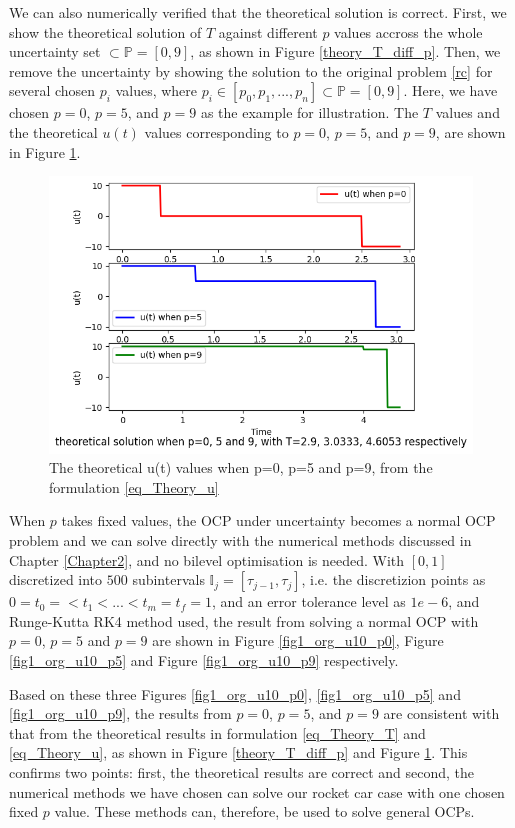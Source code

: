\documentclass  [
  paper    = a4,
  BCOR     = 10mm,
  twoside,
  fontsize = 12pt,
  fleqn,
  toc      = bibnumbered,
  toc      = listofnumbered,
  numbers  = noendperiod,
  headings = normal,
  listof   = leveldown,
  version  = 3.03
]                                       {scrreprt}
\newcommand{\<}{\langle}
\renewcommand{\>}{\rangle}
\begin{document}
We can also numerically verified that the theoretical solution is correct. First, we show the theoretical solution of $T$ against different $p$ values accross the whole uncertainty set $\subset \mathbb{P} = [0,9]$, as shown in Figure \ref{theory_T_diff_p}. Then, we remove the uncertainty by showing the solution to the original problem \ref{rc} for several chosen $p_i$ values, where $ p_i  \in [p_0, p_1, ..., p_n] \subset \mathbb{P} = [0,9]$. Here, we have chosen $p=0$,  $p=5$,  and $p=9$ as the example for illustration.  The $T$ values and the theoretical  $u(t)$ values corresponding to $p=0$,  $p=5$,  and $p=9$, are shown in Figure \ref{theory_ut_3p}. 

\begin{figure}[h]
	\centerline{\includegraphics[width=12cm]{theory_ut_3p.png}}
	\caption{The theoretical u(t) values when p=0, p=5 and p=9, from the formulation \ref{eq_Theory_u}}
	\label{theory_ut_3p}
\end{figure}

When $p$ takes fixed values, the OCP under uncertainty becomes a normal OCP problem and we can solve directly with the numerical methods discussed in Chapter \ref{Chapter2}, and no bilevel optimisation is needed. With $[0,1]$ discretized into $500$ subintervals $\mathbb{I}_j = [\tau_{j-1}, \tau_j]$, i.e. the discretizion points as $0 = t_0 =  < t_1 < ... < t_m = t_f =1 $, and an error tolerance level as $1e-6$, and Runge-Kutta RK4 method used,  the result from solving a normal OCP with $p=0$, $p=5$ and $p=9$ are shown in Figure \ref{fig1_org_u10_p0}, Figure \ref{fig1_org_u10_p5} and Figure \ref{fig1_org_u10_p9} respectively. 

Based on these three Figures \ref{fig1_org_u10_p0},  \ref{fig1_org_u10_p5} and \ref{fig1_org_u10_p9}, the results from $p=0$,  $p=5$,  and $p=9$ are consistent with that from the theoretical results in formulation \ref{eq_Theory_T} and \ref{eq_Theory_u}, as shown in Figure \ref{theory_T_diff_p} and Figure \ref{theory_ut_3p}. This confirms two points: first, the theoretical results are correct and second, the numerical methods we have chosen can solve our rocket car case with one chosen fixed $p$ value. These methods can, therefore, be used to solve general OCPs.
\end{document}

